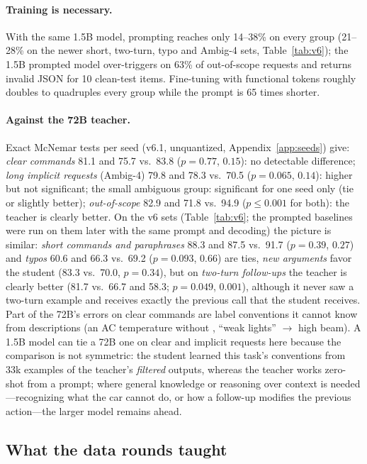 \paragraph{Training is necessary.} With the same 1.5B model, prompting reaches only 14--38\% on every group (21--28\% on the
newer short, two-turn, typo and Ambig-4 sets, Table~\ref{tab:v6}); the 1.5B prompted model over-triggers on 63\% of
out-of-scope requests and returns invalid JSON for 10 clean-test items. Fine-tuning with functional tokens roughly doubles to
quadruples every group while the prompt is 65 times shorter.

\paragraph{Against the 72B teacher.} Exact McNemar tests per seed (v6.1, unquantized, Appendix~\ref{app:seeds}) give:
\emph{clear commands} 81.1 and 75.7 vs.\ 83.8 ($p=0.77$, $0.15$): no detectable difference; \emph{long implicit requests}
(Ambig-4) 79.8 and 78.3 vs.\ 70.5 ($p=0.065$, $0.14$): higher but not significant; the small ambiguous group: significant for
one seed only (tie or slightly better); \emph{out-of-scope} 82.9 and 71.8 vs.\ 94.9 ($p\le0.001$ for both): the teacher is
clearly better. On the v6 sets (Table~\ref{tab:v6}; the prompted baselines were run on them later with the same prompt and
decoding) the picture is similar: \emph{short commands and paraphrases} 88.3 and 87.5 vs.\ 91.7 ($p=0.39$, $0.27$) and
\emph{typos} 60.6 and 66.3 vs.\ 69.2 ($p=0.093$, $0.66$) are ties, \emph{new arguments} favor the student (83.3 vs.\ 70.0,
$p=0.34$), but on \emph{two-turn follow-ups} the teacher is clearly better (81.7 vs.\ 66.7 and 58.3; $p=0.049$, $0.001$),
although it never saw a two-turn example and receives exactly the previous call that the student receives. Part of the 72B's errors on clear commands are label conventions it cannot know from descriptions (an AC
temperature without , ``weak lights'' $\rightarrow$ high beam). A 1.5B model can tie a 72B one on clear and
implicit requests here because the comparison is not symmetric: the student learned this task's conventions from 33k
examples of the teacher's \emph{filtered} outputs, whereas the teacher works zero-shot from a prompt; where general knowledge
or reasoning over context is needed---recognizing what the car cannot do, or how a follow-up modifies the previous
action---the larger model remains ahead.

\subsection{What the data rounds taught}
\label{sec:rounds}

